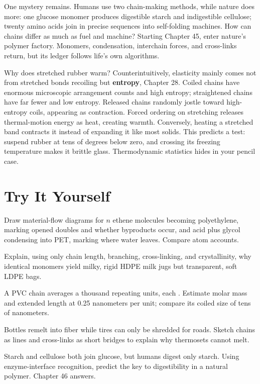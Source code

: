 One mystery remains. Humans use two chain-making methods, while nature does more: one glucose monomer produces digestible starch and indigestible cellulose; twenty amino acids join in precise sequences into self-folding machines. How can chains differ as much as fuel and machine? Starting Chapter 45, enter nature's polymer factory. Monomers, condensation, interchain forces, and cross-links return, but its ledger follows life's own algorithms.

\begin{tiaozhan}
Why does stretched rubber warm? Counterintuitively, elasticity mainly comes not from stretched bonds recoiling but \textbf{entropy}, Chapter 28. Coiled chains have enormous microscopic arrangement counts and high entropy; straightened chains have far fewer and low entropy. Released chains randomly jostle toward high-entropy coils, appearing as contraction. Forced ordering on stretching releases thermal-motion energy as heat, creating warmth. Conversely, heating a stretched band contracts it instead of expanding it like most solids. This predicts a test: suspend rubber at tens of degrees below zero, and crossing its freezing temperature makes it brittle glass. Thermodynamic statistics hides in your pencil case.
\end{tiaozhan}

\section*{Try It Yourself}

\begin{sikaoti}
\item Draw material-flow diagrams for $n$ ethene molecules becoming polyethylene, marking opened doubles and whether byproducts occur, and acid plus glycol condensing into PET, marking where water leaves. Compare atom accounts.
\item Explain, using only chain length, branching, cross-linking, and crystallinity, why identical monomers yield milky, rigid HDPE milk jugs but transparent, soft LDPE bags.
\item A PVC chain averages a thousand repeating units, each . Estimate molar mass and extended length at 0.25 nanometers per unit; compare its coiled size of tens of nanometers.
\item Bottles remelt into fiber while tires can only be shredded for roads. Sketch chains as lines and cross-links as short bridges to explain why thermosets cannot melt.
\item Starch and cellulose both join glucose, but humans digest only starch. Using enzyme-interface recognition, predict the key to digestibility in a natural polymer. Chapter 46 answers.
\end{sikaoti}
